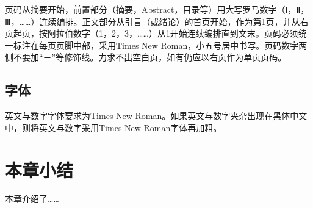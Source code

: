 页码从摘要开始，前置部分（摘要，Abstract，目录等）用大写罗马数字（Ⅰ，Ⅱ，Ⅲ，……）连续编排。正文部分从引言（或绪论）的首页开始，作为第1页，并从右页起页，按阿拉伯数字（1，2，3，……）从1开始连续编排直到文末。页码必须统一标注在每页页脚中部，采用Times New Roman，小五号居中书写。页码数字两侧不要加“－”等修饰线。力求不出空白页，如有仍应以右页作为单页页码。

\subsection{字体}

英文与数字字体要求为Times New Roman。如果英文与数字夹杂出现在黑体中文中，则将英文与数字采用Times New Roman字体再加粗。

\section{本章小结}

本章介绍了…… 
